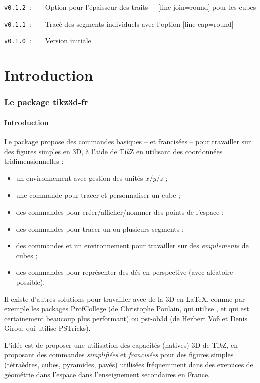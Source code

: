 \documentclass[french,a4paper,11pt]{article}
\providecommand\tikzlogo{Ti\textit{k}Z}
\providecommand\PSTricks{\textsf{PSTricks}\xspace}
\let\pstricks\PSTricks
\let\TikZ\tikzlogo
\begin{document}
\verb|v0.1.2|~:~~~~Option pour l'épaisseur des traits + \textsf{[line join=round]} pour les cubes

\verb|v0.1.1|~:~~~~Tracé des segments individuels avec l'option \textsf{[line cap=round]}

\verb|v0.1.0|~:~~~~Version initiale

\pagebreak

\part{Introduction}

\section{Le package tikz3d-fr}

\subsection{Introduction}

\begin{noteblock}
Le package propose des commandes basiques -- et francisées -- pour travailler sur des figures simples en 3D, à l'aide de \TikZ{} en utilisant des coordonnées tridimensionnelles :

\begin{itemize}
	\item un environnement avec gestion des unités $x/y/z$ ;
	\item une commande pour tracer et personnaliser un cube ;
	\item des commandes pour créer/afficher/nommer des points de l'espace ;
	\item des commandes pour tracer un ou plusieurs segments ;
	\item des commandes et un environnement pour travailler sur des \textit{empilements} de cubes ;
	\item des commandes pour représenter des dés en perspective (avec aléatoire possible).
\end{itemize}
\vspace*{-\baselineskip}\leavevmode
\end{noteblock}

\begin{importantblock}
Il existe d'autres solutions pour travailler avec de la 3D en \LaTeX, comme par exemple les packages \textsf{ProfCollege}\footnotemark{} (de Christophe Poulain, qui utilise , et qui est certainement beaucoup plus performant) ou \textsf{pst-ob3d}\footnotemark{} (de Herbert Voß et Denis Girou, qui utilise \pstricks).

\smallskip

L'idée est de proposer une utilisation des capacités (natives) 3D de \TikZ, en proposant des commandes \textit{simplifiées} et \textit{francisées} pour des figures simples (tétraèdres, cubes, pyramides, pavés) utilisées fréquemment dans des exercices de géométrie dans l'espace dans l'enseignement secondaires en France.
\end{importantblock}
\end{document}

